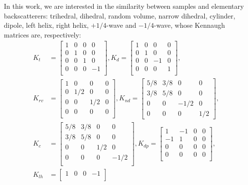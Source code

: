 \documentclass[conference]{IEEEtran}
\begin{document}
In this work, we are interested in the similarity between samples and elementary backscatterers:
trihedral, dihedral, random volume, narrow dihedral, cylinder, dipole, left helix, right helix, $+1/4$-wave and $-1/4$-wave, whose Kennaugh matrices are, respectively:
\begin{align*}
K_t &=
\begin{bmatrix}
1 & 0 & 0 & 0\\
0 & 1 & 0 & 0\\
0 & 0 & 1 & 0\\
0 & 0 & 0 & -1\\
\end{bmatrix},
K_d =
\begin{bmatrix}
1 & 0 & 0 & 0\\
0 & 1 & 0 & 0\\
0 & 0 & -1 & 0\\
0 & 0 & 0 & 1\\
\end{bmatrix},\\
K_{rv} &=
\begin{bmatrix}
1 & 0 & 0 & 0\\
0 & 1/2 & 0 & 0\\
0 & 0 & 1/2 & 0\\
0 & 0 & 0 & 0\\
\end{bmatrix},
K_{nd}  =
\begin{bmatrix}
5/8 & 3/8 & 0 & 0\\
3/8 & 5/8 & 0 & 0\\
0 & 0 & -1/2 & 0\\
0 & 0 & 0 & 1/2
\end{bmatrix},\\
K_{c} &=
\begin{bmatrix}
5/8 & 3/8 & 0 & 0\\
3/8 & 5/8 & 0 & 0\\
0 & 0 & 1/2 & 0\\
0 & 0 & 0 & -1/2\\
\end{bmatrix},
K_{dp}  =
\begin{bmatrix}
1 & -1 & 0 & 0\\
-1 & 1 & 0 & 0\\
0 & 0 & 0 & 0\\
0 & 0 & 0 & 0\\
\end{bmatrix},\\
K_{lh} &=
\begin{bmatrix}
1 & 0 & 0 & -1\\

\end{bmatrix}
\end{align*}
\end{document}
